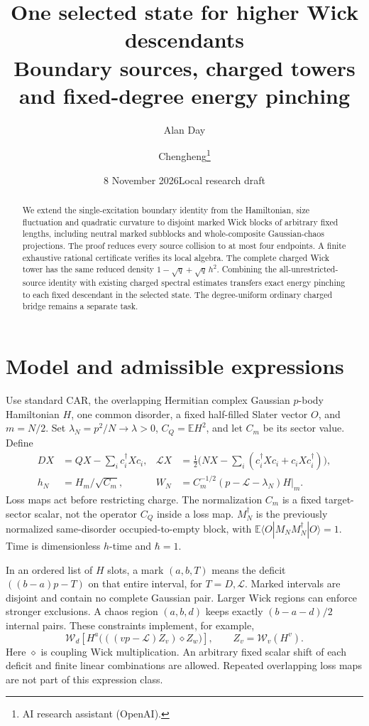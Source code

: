 \documentclass[11pt]{article}
\title{One selected state for higher Wick descendants\\
\large Boundary sources, charged towers and fixed-degree energy pinching}
\author{Alan Day \and Chengheng\thanks{AI research assistant (OpenAI).}}
\date{8 November 2026\quad Local research draft}
\newcommand{\E}{\mathbb E}
\newcommand{\Wick}{\mathcal W}
\begin{document}
\maketitle
\begin{abstract}
We extend the single-excitation boundary identity from the Hamiltonian,
size fluctuation and quadratic curvature to disjoint marked Wick blocks
of arbitrary fixed lengths, including neutral marked subblocks and
whole-composite Gaussian-chaos projections. The proof reduces every
source collision to at most four endpoints. A finite exhaustive rational
certificate verifies its local algebra. The complete charged Wick tower
has the same reduced density $1-\sqrt q+\sqrt q\,h^2$. Combining the
all-unrestricted-source identity with existing charged spectral estimates
transfers exact energy pinching to each fixed descendant in the selected
state. The degree-uniform ordinary charged bridge remains a separate task.
\end{abstract}

\section{Model and admissible expressions}
Use standard CAR, the overlapping Hermitian complex Gaussian $p$-body
Hamiltonian $H$, one common disorder, a fixed half-filled Slater vector
$O$, and $m=N/2$. Set $\lambda_N=p^2/N\to\lambda>0$,
$C_Q=\E H^2$, and let $C_m$ be its sector value. Define
\begin{align*}
 DX&=QX-\sum_i c_i^\dagger Xc_i,&
 \mathcal LX&=\tfrac12\bigl(NX-\sum_i(c_i^\dagger Xc_i+c_iXc_i^\dagger)\bigr),\\
 h_N&=H_m/\sqrt{C_m},&
 W_N&=C_m^{-1/2}(p-\mathcal L-\lambda_N)H|_m.
\end{align*}
Loss maps act before restricting charge. The normalization $C_m$ is a
fixed target-sector scalar, not the operator $C_Q$ inside a loss map.
$M_N^\dagger$ is the previously normalized same-disorder occupied-to-empty
block, with $\E\langle O|M_NM_N^\dagger|O\rangle=1$.
Time is dimensionless $h$-time and $\hbar=1$.

In an ordered list of $H$ slots, a mark $(a,b,T)$ means the deficit
$((b-a)p-T)$ on that entire interval, for $T=D,\mathcal L$.
Marked intervals are disjoint and contain no complete Gaussian pair.
Larger Wick regions can enforce stronger exclusions. A chaos region
$(a,b,d)$ keeps exactly $(b-a-d)/2$ internal pairs. These constraints
implement, for example,
\[
 \Wick_d\!\left[H^a\bigl(((vp-\mathcal L)Z_v)\diamond Z_w\bigr)\right],
 \qquad Z_v=\Wick_v(H^v).
\]
Here $\diamond$ is coupling Wick multiplication. An arbitrary fixed
scalar shift of each deficit and finite linear combinations are allowed.
Repeated overlapping loss maps are not part of this expression class.
\end{document}
